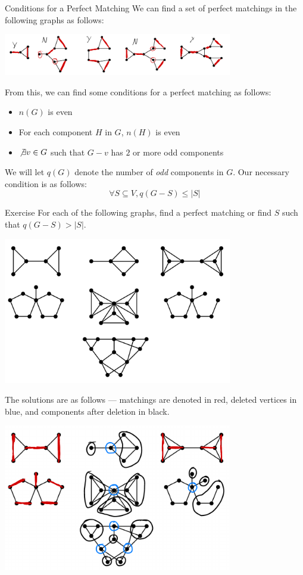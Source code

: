 \documentclass[10pt]{extarticle}
\begin{document}
  \begin{problem}{Conditions for a Perfect Matching}
    We can find a set of perfect matchings in the following graphs as follows:
    \begin{center}
      \includegraphics[width=10cm]{matchings}
    \end{center}
    From this, we can find some conditions for a perfect matching as follows:
    \begin{itemize}
      \item $n(G)$ is even
      \item For each component $H$ in $G$, $n(H)$ is even
      \item $\not\exists v\in G$ such that $G-v$ has $2$ or more odd components
    \end{itemize}
    We will let $q(G)$ denote the number of \textit{odd} components in $G$. Our necessary condition is as follows:
    \[
      \forall S\subseteq V, q(G-S) \leq |S|
    \] 
    \begin{problem}{Exercise}
      For each of the following graphs, find a perfect matching or find $S$ such that $q(G-S) > |S|$.
      \begin{center}
        \includegraphics[width=10cm]{odd_components_matchings}
      \end{center}
      \tcblower
      The solutions are as follows --- matchings are denoted in red, deleted vertices in blue, and components after deletion in black.
      \begin{center}
        \includegraphics[width=10cm]{odd_components_matchings_solution}
      \end{center}
    \end{problem}
  \end{problem}
\end{document}
